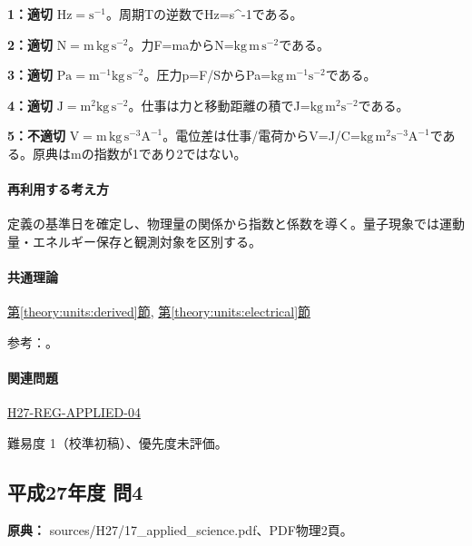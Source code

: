 \noindent\textbf{1：適切} \(\mathrm{Hz=s^{-1}}\)。周期Tの逆数でHz=\allowbreak{}s\textasciicircum{}-1である。\par

\noindent\textbf{2：適切} \(\mathrm{N=m\,kg\,s^{-2}}\)。力F=\allowbreak{}maからN=\(\mathrm{kg\,m\,s^{-2}}\)である。\par

\noindent\textbf{3：適切} \(\mathrm{Pa=m^{-1}kg\,s^{-2}}\)。圧力p=\allowbreak{}F/SからPa=\(\mathrm{kg\,m^{-1}s^{-2}}\)である。\par

\noindent\textbf{4：適切} \(\mathrm{J=m^2kg\,s^{-2}}\)。仕事は力と移動距離の積でJ=\(\mathrm{kg\,m^2s^{-2}}\)である。\par

\noindent\textbf{5：不適切} \(\mathrm{V=m\,kg\,s^{-3}A^{-1}}\)。電位差は仕事/電荷からV=\allowbreak{}J/C=\(\mathrm{kg\,m^2s^{-3}A^{-1}}\)である。原典はmの指数が1であり2ではない。\par

\paragraph{再利用する考え方} 定義の基準日を確定し、物理量の関係から指数と係数を導く。量子現象では運動量・エネルギー保存と観測対象を区別する。

\paragraph{共通理論} \hyperref[theory:units:derived]{第\ref*{theory:units:derived}節}, \hyperref[theory:units:electrical]{第\ref*{theory:units:electrical}節}

\par 参考：\cite{si_nist811,si_brochure9}。

\paragraph{関連問題} \hyperref[q:h27-reg-applied-04]{H27-REG-APPLIED-04}

\par 難易度 1（校準初稿）、優先度未評価。

\subsection{平成27年度 問4}
\label{q:h27-reg-applied-04}

\noindent\textbf{原典：} sources/H27/17\_applied\_science.pdf、PDF物理2頁。

